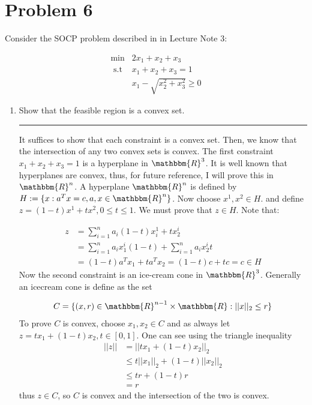 \documentclass{article} %
\newcommand{\R}{\mathbbm{R}}
\begin{document}
\section*{Problem 6}
Consider the SOCP problem described in in Lecture Note 3:

\begin{equation*}
\begin{aligned}
\min  & 2 x_1 + x_2 + x_3 \\ 
\mbox{ s.t } & x_1 + x_2 + x_3 = 1 \\ 
& x_1 - \sqrt{x_2^2 + x_3^2} \geq 0
\end{aligned}
\end{equation*}

\begin{enumerate}
\item Show that the feasible region is a convex set. 

\rule{\textwidth}{1pt}

It suffices to show that each constraint is a convex set. Then, we know that the intersection of any two convex sets is convex. 
The first constraint $x_1 + x_2 + x_3 = 1$ is a hyperplane in $\R^3$. It is  well known that hyperplanes are convex, thus, for future
reference, I will prove this in $\R^n$. A hyperplane  $\R^n$ is defined by $H := \{ x: a^Tx = c, a, x \in \R^n\}$. Now choose $x^1, x^2 \in H$. and 
define $z = (1 - t)x^1 + t x^2, 0 \leq t \leq 1$. We must prove that $z \in H$. Note that:

\begin{equation*}
\begin{aligned}
z &= \sum_{i=1}^{n} a_i (1 - t)x_i^1 + t x_2^i  \\ 
&= \sum_{i=1}^n a_i x_1^i (1-t) + \sum_{i=1}^{n} a_i x_2^i t \\ 
&= (1-t)a^T x_1 + t a^T x_2 = (1 - t)c + t c = c \in H
\end{aligned}
\end{equation*}
Now the second constraint is an ice-cream cone in $\R^3$. Generally an icecream cone is define as the set

\begin{gather*}
C = \{ (x, r) \in \R^{n-1} \times \R: ||x||_2 \leq r \}
\end{gather*}
To prove $C$ is convex, choose $x_1, x_2 \in C$ and as always let $z = t x_1  + (1 - t) x_2, t \in [0,1]$. One can see using 
the triangle inequality 
\begin{equation*}
\begin{aligned}
||z|| &= ||t x_1 + (1 - t) x_2 ||_2 \\ 
&\leq t||x_1||_2 + (1 -t) ||x_2||_2 \\ 
&\leq t r + (1 -t)r  \\ 
&= r
\end{aligned}
\end{equation*}
thus $z \in C$, so $C$ is convex and the intersection of the two is convex. 


\end{enumerate}
\end{document}
